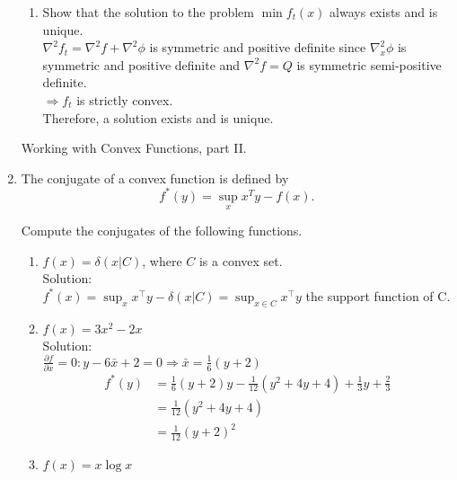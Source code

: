\documentclass[12pt]{amsart}
\newcommand{\grad}{\nabla}
\begin{document}
\begin{enumerate}
\begin{enumerate}
\item
Show that the solution to the problem $\min f_t(x)$ always
exists and is unique. \\

$\grad^2 f_t = \grad^2 f + \grad^2 \phi$ is symmetric and positive definite since $\grad_x^2 \phi$ is symmetric and positive definite and $\grad^2 f = Q$ is symmetric semi-positive definite.\\
$\Rightarrow f_t$ is strictly convex.  \\
Therefore, a solution exists and is unique.\\
\end{enumerate}



\newpage

\noindent
{\sf Working with Convex Functions, part II.}

\item The conjugate of a convex function is defined by 
\[
f^*(y) = \sup_x x^Ty - f(x).
\]

Compute the conjugates of the following functions. 
\begin{enumerate}

\item $f(x) = \delta(x|C)$, where $C$ is a convex set.  \\

\noindent
Solution:\\
$f^*(x) = \displaystyle \sup_x x^\top y - \delta(x|C) = \sup_{x \in C} x^\top y$ the support function of C. \\

\item $f(x) = 3x^2 - 2x$ \\

\noindent
Solution:\\
$\frac{\partial f}{\partial x} = 0: y - 6\bar{x} + 2 = 0 \Rightarrow \bar{x} = \frac{1}{6} (y+2)$
\begin{align*}
f^*(y) &= \frac{1}{6}(y+2)y - \frac{1}{12}(y^2 + 4y + 4) + \frac{1}{3}y + \frac{2}{3}\\
         &= \frac{1}{12}(y^2 + 4y + 4) \\
	 &= \frac{1}{12} (y+2)^2
\end{align*}

\item $f(x) = x\log x$\\


\end{enumerate}
\end{enumerate}
\end{document}

